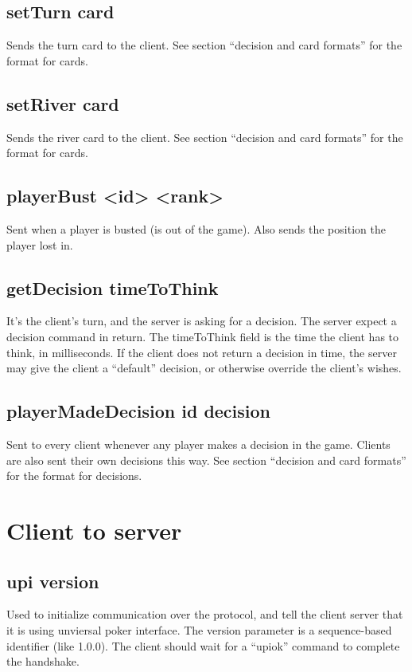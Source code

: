 \documentclass{article}
\begin{document}
\subsection*{setTurn \textlangle{}card\textrangle{}}
Sends the turn card to the client. See section ``decision and card formats'' for the format for cards.

\subsection*{setRiver \textlangle{}card\textrangle{}}
Sends the river card to the client. See section ``decision and card formats'' for the format for cards.

\subsection{playerBust <id> <rank>}
Sent when a player is busted (is out of the game). Also sends the position the player lost in.  

\subsection*{getDecision \textlangle{}timeToThink\textrangle{}}
It's the client's turn, and the server is asking for a decision. The server expect a decision command in return. The timeToThink field is the time the client has to think, in milliseconds. If the client does not return a decision in time, the server may give the client a ``default'' decision, or otherwise override the client's wishes.

\subsection*{playerMadeDecision \textlangle{}id\textrangle{} \textlangle{}decision\textrangle{}}
Sent to every client whenever any player makes a decision in the game. Clients are also sent their own decisions this way. See section ``decision and card formats'' for the format for decisions.

\section{Client to server}

\subsection*{upi \textlangle{}version\textrangle{}}
Used to initialize communication over the protocol, and tell the client server that it is using unviersal poker interface. The version parameter is a sequence-based identifier (like 1.0.0). The client should wait for a ``upiok'' command to complete the handshake.
\end{document}
